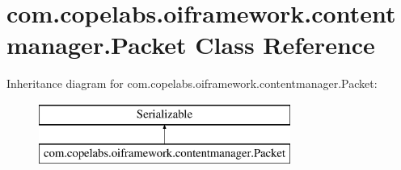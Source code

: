 \hypertarget{classcom_1_1copelabs_1_1oiframework_1_1contentmanager_1_1_packet}{}\section{com.\+copelabs.\+oiframework.\+contentmanager.\+Packet Class Reference}
\label{classcom_1_1copelabs_1_1oiframework_1_1contentmanager_1_1_packet}
Inheritance diagram for com.\+copelabs.\+oiframework.\+contentmanager.\+Packet\+:\begin{figure}[H]
\begin{center}
\leavevmode
\includegraphics[height=2.000000cm]{classcom_1_1copelabs_1_1oiframework_1_1contentmanager_1_1_packet}
\end{center}
\end{figure}
